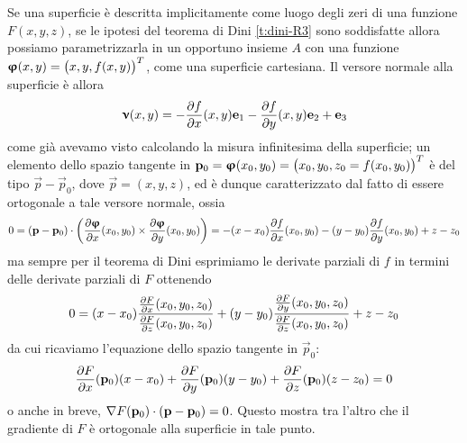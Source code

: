 \begin{osservazione} \label{o:spazio-tangente-superficie-implicita}
	Se una superficie è descritta implicitamente come luogo degli zeri di una funzione $F(x,y,z)$, se le ipotesi del teorema di Dini \ref{t:dini-R3} sono soddisfatte allora possiamo parametrizzarla in un opportuno insieme $A$ con una funzione $\bm{\upvarphi}(x,y)=\big(x,y,f(x,y)\big)^T$, come una superficie cartesiana.
	Il versore normale alla superficie è allora
	\begin{equation}
		\bm{\upnu}(x,y)=-\frac{\partial {f}}{\partial {x}}(x,y)\mathbf{e}_1-\frac{\partial {f}}{\partial {y}}(x,y)\mathbf{e}_2+\mathbf{e}_3
	\end{equation}
	come già avevamo visto calcolando la misura infinitesima della superficie; un elemento dello spazio tangente in $\mathbf{p}_0=\bm{\upvarphi}(x_0,y_0)=\big(x_0,y_0,z_0=f(x_0,y_0)\big)^T$ è del tipo $\vec p-\vec p_0$, dove $\vec p=(x,y,z)$, ed è dunque caratterizzato dal fatto di essere ortogonale a tale versore normale, ossia
	\begin{equation}
		0={(\mathbf{p}-\mathbf{p}_0)}\cdot{\bigg(\frac{\partial {\bm{\upvarphi}}}{\partial {x}}(x_0,y_0)\times\frac{\partial {\bm{\upvarphi}}}{\partial {y}}(x_0,y_0)\bigg)}=
		-(x-x_0)\frac{\partial {f}}{\partial {x}}(x_0,y_0)-(y-y_0)\frac{\partial {f}}{\partial {y}}(x_0,y_0)+z-z_0
	\end{equation}
	ma sempre per il teorema di Dini esprimiamo le derivate parziali di $f$ in termini delle derivate parziali di $F$ ottenendo
	\begin{equation}
		0=(x-x_0)\dfrac{\frac{\partial {F}}{\partial {x}}(x_0,y_0,z_0)}{\frac{\partial {F}}{\partial {z}}(x_0,y_0,z_0)}+(y-y_0)\dfrac{\frac{\partial {F}}{\partial {y}}(x_0,y_0,z_0)}{\frac{\partial {F}}{\partial {z}}(x_0,y_0,z_0)}+z-z_0
	\end{equation}
	da cui ricaviamo l'equazione dello spazio tangente in $\vec p_0$:
	\begin{equation}
		\frac{\partial {F}}{\partial {x}}(\mathbf{p}_0)(x-x_0)+\frac{\partial {F}}{\partial {y}}(\mathbf{p}_0)(y-y_0)+\frac{\partial {F}}{\partial {z}}(\mathbf{p}_0)(z-z_0)=0
		\label{eq:spazio-tangente-superficie-implicita}
	\end{equation}
	o anche in breve, ${\nabla F(\mathbf{p}_0)}\cdot{(\mathbf{p}-\mathbf{p}_0)}=0$.
	Questo mostra tra l'altro che il gradiente di $F$ è ortogonale alla superficie in tale punto.
\end{osservazione}

